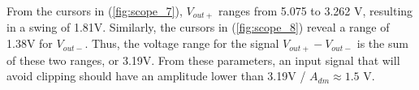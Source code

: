 \FloatBarrier

From the cursors in (\ref{fig:scope_7}), $V_{out+}$ ranges from 5.075 to 3.262 \si{\volt}, resulting in a swing of 1.81\si{\volt}.
Similarly, the cursors in (\ref{fig:scope_8}) reveal a range of 1.38\si{\volt} for $V_{out-}$.
Thus, the voltage range for the signal $V_{out+} - V_{out-}$ is the sum of these two ranges, or 3.19\si{\volt}.
From these parameters, an input signal that will avoid clipping should have an amplitude lower than 3.19\si{\volt} / $A_{dm} \approx 1.5$ \si{\volt}.
